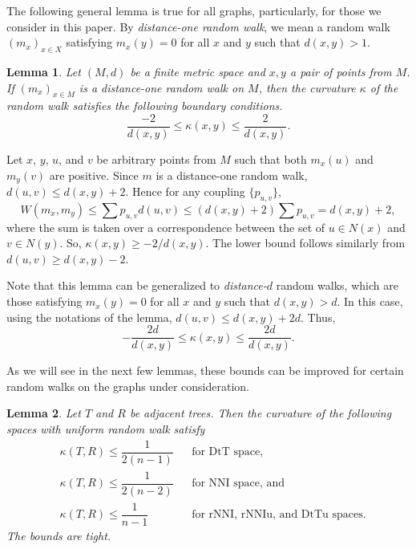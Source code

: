 \documentclass{amsart}
\newtheorem{lemma}{Lemma}
\theoremstyle{definition}
\newcommand{\nni}{\mathrm{NNI}}
\newcommand{\rnni}{\mathrm{rNNI}}
\newcommand{\rnniu}{\mathrm{rNNIu}}
\newcommand{\dtt}{\mathrm{DtT}}
\newcommand{\dttu}{\mathrm{DtTu}}
\begin{document}
The following general lemma is true for all graphs, particularly, for those we consider in this paper.
By {\em distance-one random walk}, we mean a random walk $(m_x)_{x \in X}$ satisfying $m_x(y) = 0$ for all $x$ and $y$ such that $d(x,y) > 1$.

\begin{lemma}\label{curvBoundGeneral}
Let $(M,d)$ be a finite metric space and $x,y$ a pair of points from $M$.
If $(m_x)_{x \in M}$ is a distance-one random walk on $M$, then the curvature $\kappa$ of the random walk satisfies the following boundary conditions.
\[
\dfrac{-2}{d(x,y)} \leq \kappa(x,y) \leq \dfrac{2}{d(x,y)}.
\]
\end{lemma}

\proof
Let $x$, $y$, $u$, and $v$ be arbitrary points from $M$ such that both $m_x(u)$ and $m_y(v)$ are positive.
Since $m$ is a distance-one random walk, $d(u,v) \leq d(x,y) + 2$.
Hence for any coupling $\{p_{u,v}\}$,
\[
W(m_x,m_y) \leq \sum p_{u,v} d(u,v) \leq (d(x,y)+2)\sum p_{u,v} = d(x,y) + 2,
\]
where the sum is taken over a correspondence between the set of $u \in N(x)$ and $v \in N(y)$.
So, $\kappa(x,y) \geq - 2/d(x,y)$.
The lower bound follows similarly from $d(u,v) \geq d(x,y) - 2$.
\endproof

Note that this lemma can be generalized to {\em distance-$d$} random walks, which are those satisfying $m_x(y) = 0$ for all $x$ and $y$ such that $d(x,y) > d$.
In this case, using the notations of the lemma, $d(u,v) \leq d(x,y) + 2d$.
Thus,
\[
-\dfrac{2d}{d(x,y)} \leq \kappa(x,y) \leq \dfrac{2d}{d(x,y)}.
\]

As we will see in the next few lemmas, these bounds can be improved for certain random walks on the graphs under consideration.

\begin{lemma}\label{uniformUpper}
Let $T$ and $R$ be adjacent trees.
Then the curvature of the following spaces with uniform random walk satisfy
\begin{align*}
& \kappa(T,R) \leq \dfrac{1}{2(n-1)}	&& \mbox{for $\dtt$ space,}\\
& \kappa(T,R) \leq \dfrac{1}{2(n-2)}	&& \mbox{for $\nni$ space, and}\\
& \kappa(T,R) \leq \dfrac{1}{n-1}	&& \mbox{for $\rnni$, $\rnniu$, and $\dttu$ spaces.}
\end{align*}
The bounds are tight.
\end{lemma}
\end{document}
